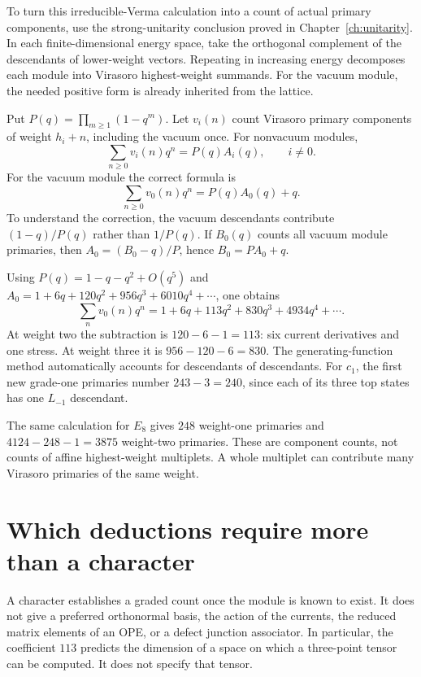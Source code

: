 To turn this irreducible-Verma calculation into a count of actual
primary components, use the strong-unitarity conclusion proved in
Chapter~\ref{ch:unitarity}. In each finite-dimensional energy space,
take the orthogonal complement of the descendants of lower-weight
vectors. Repeating in increasing energy decomposes each module into
Virasoro highest-weight summands. For the vacuum module, the needed
positive form is already inherited from the lattice.

Put $P(q)=\prod_{m\ge1}(1-q^m)$. Let $v_i(n)$ count Virasoro
primary components of weight $h_i+n$, including the vacuum once.
For nonvacuum modules,
\begin{equation}
 \sum_{n\ge0}v_i(n)q^n=P(q)A_i(q),\qquad i\ne0.
 \label{eq:char-primary-nonvac}
\end{equation}
For the vacuum module the correct formula is
\begin{equation}
 \sum_{n\ge0}v_0(n)q^n=P(q)A_0(q)+q.
 \label{eq:char-primary-vac}
\end{equation}
To understand the correction, the vacuum descendants contribute
$(1-q)/P(q)$ rather than $1/P(q)$. If $B_0(q)$ counts all vacuum
module primaries, then $A_0=(B_0-q)/P$, hence $B_0=PA_0+q$.

\begin{example}
Using
$P(q)=1-q-q^2+O(q^5)$ and
$A_0=1+6q+120q^2+956q^3+6010q^4+\cdots$, one obtains
\[
 \sum_nv_0(n)q^n
 =1+6q+113q^2+830q^3+4934q^4+\cdots.
\]
At weight two the subtraction is
$120-6-1=113$: six current derivatives and one stress.
At weight three it is $956-120-6=830$. The generating-function
method automatically accounts for descendants of descendants.
For $c_1$, the first new grade-one primaries number
$243-3=240$, since each of its three top states has one
$L_{-1}$ descendant.
\end{example}

The same calculation for $E_8$ gives $248$ weight-one primaries and
$4124-248-1=3875$ weight-two primaries. These are component counts,
not counts of affine highest-weight multiplets. A whole multiplet
can contribute many Virasoro primaries of the same weight.

\section{Which deductions require more than a character}

A character establishes a graded count once the module is known to
exist. It does not give a preferred orthonormal basis, the action of
the currents, the reduced matrix elements of an OPE, or a defect
junction associator. In particular, the coefficient $113$ predicts
the dimension of a space on which a three-point tensor can be
computed. It does not specify that tensor.

